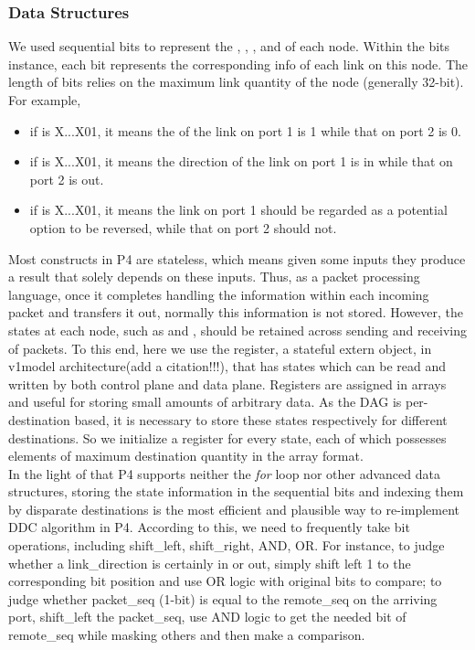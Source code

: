 \subsubsection{Data Structures}
We used sequential bits to represent the \ls, \rs, \ld, and \tr of each node. Within the bits instance, each bit represents the corresponding info  of each link on this node. The length of bits relies on the maximum link quantity of the node (generally 32-bit). For example, 
\begin{itemize}
\item if \ls is X...X01, it means the \ls of the link on port 1 is 1 while that on port 2 is 0.
\item if \ld is X...X01, it means the direction of the link on port 1 is in while that on port 2 is out.
\item if \tr is X...X01, it means the link on port 1 should be regarded as a potential option to be reversed, while that on port 2 should not.
\end{itemize}
Most constructs in P4 are stateless, which means given some inputs they produce a result that solely depends on these inputs. Thus, as a packet processing language, once it completes handling the information within each incoming packet and transfers it out, normally this information is not stored. However, the states at each node, such as \ls and \rs, should be retained across sending and receiving of packets. To this end, here we use the register, a stateful extern object, in v1model architecture(add a citation!!!), that has states which can be read and written by both control plane and data plane. Registers are assigned in arrays and useful for storing small amounts of arbitrary data. As the DAG is per-destination based, it is necessary to store these states respectively for different destinations. So we initialize a register for every state, each of which possesses elements of maximum destination quantity in the array format. \\

In the light of that P4 supports neither the \textit{for} loop nor other advanced data structures, storing the state information in the sequential bits and indexing them by disparate destinations is the most efficient and plausible way to re-implement DDC algorithm in P4. According to this, we need to frequently take bit operations, including shift\_left, shift\_right, AND, OR.  For instance, to judge whether a link\_direction is certainly in or out, simply shift left 1 to the corresponding bit position and use OR logic with original bits to compare; to judge whether packet\_seq (1-bit) is equal to the remote\_seq on the arriving port, shift\_left the packet\_seq, use AND logic to get the needed bit of remote\_seq while masking others and then make a comparison.

